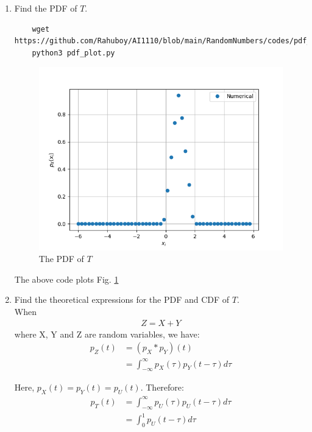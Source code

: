 \documentclass[journal,12pt,twocolumn]{IEEEtran}
\renewcommand\thesection{\arabic{section}}
\begin{document}
\begin{enumerate}[label=\thesection.\arabic*
    ,ref=\thesection.\theenumi]
        The above code plots Fig. \ref{fig:tri_cdf}

\item Find the PDF of $T$.

\begin{lstlisting}
    wget https://github.com/Rahuboy/AI1110/blob/main/RandomNumbers/codes/pdf_plot.py
    python3 pdf_plot.py
    \end{lstlisting}

  
    \begin{figure}
        \centering
        \includegraphics[width=\columnwidth]{./figures/PDF_tri.png}
        \caption{The PDF of $T$}
        \label{fig:tri_pdf}
        \end{figure}

        The above code plots Fig. \ref{fig:tri_pdf}
 
\item Find the theoretical expressions for the PDF and CDF of $T$.
\\
\solution When 
\begin{align}
    Z = X + Y
\end{align}
where X, Y and Z are random variables, we have:
\begin{align}
    p_Z(t) &= (p_X * p_Y)(t) \\
    &= \int _{-\infty} ^{\infty} p_X(\tau) p_Y(t-\tau) d\tau
\end{align}

Here, $p_X(t) = p_Y(t) = p_U(t) $. Therefore:
\begin{align}
    p_T(t) &= \int _{-\infty} ^{\infty} p_U(\tau) p_U(t-\tau) d\tau \\
    &= \int _0 ^1 p_U(t-\tau) d\tau
\end{align}


\end{enumerate}
\end{document}
